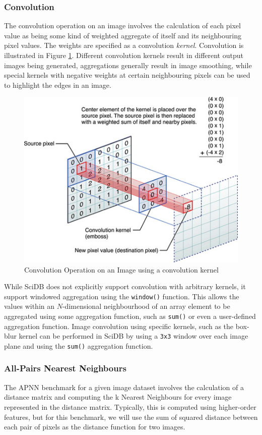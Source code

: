 \documentclass[letterpaper,twocolumn,10pt]{article}
\begin{document}
\subsubsection{Convolution} \label{sec:CONV}

The convolution operation on an image involves the calculation of each pixel value as being some kind of weighted aggregate of itself and its neighbouring pixel values. The weights are specified as a convolution {\em kernel}. Convolution is illustrated in Figure \ref{fig:convo}. Different convolution kernels result in different output images being generated, aggregations generally result in image smoothing, while special kernels with negative weights at certain neighbouring pixels can be used to highlight the edges in an image. 

\begin{figure}[h]
\centering
\includegraphics[width=.4\textwidth]{convolution.png}
\caption{Convolution Operation on an Image using a convolution kernel\protect\footnotemark}
\label{fig:convo}
\end{figure}


While SciDB does not explicitly support convolution with arbitrary kernels, it support windowed aggregation using the \texttt{window()} function. This allows the values within an $N$-dimensional neighbourhood of an array element to be aggregated using some aggregation function, such as \texttt{sum()} or even a user-defined aggregation function. Image convolution using specific kernels, such as the box-blur kernel can be  performed in SciDB by using a \texttt{3x3} window over each image plane and using the \texttt{sum()} aggregation function.

\subsubsection{All-Pairs Nearest Neighbours} \label{sec:APNN}
The APNN benchmark for a given image dataset involves the calculation of a distance matrix and computing the k Nearest Neighbours for every image represented in the distance matrix. Typically, this is computed using higher-order features, but for this benchmark, we will use the sum of squared distance between each pair of pixels as the distance function for two images. 
\end{document}

